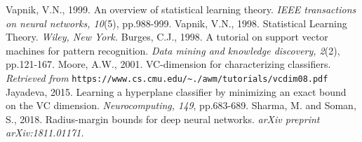 \documentclass[11pt]{article}
\begin{document}
\newpage
	
	\begin{thebibliography}{10}
        Vapnik, V.N., 1999. An overview of statistical learning theory. \emph{IEEE transactions on neural networks, 10}(5), pp.988-999.
        Vapnik, V.N., 1998. Statistical Learning Theory. \emph{Wiley, New York.}
        Burges, C.J., 1998. A tutorial on support vector machines for pattern recognition. \emph{Data mining and knowledge discovery, 2}(2), pp.121-167.
        Moore, A.W., 2001. VC-dimension for characterizing classifiers. \emph{Retrieved from} \texttt{https://www.cs.cmu.edu/\textasciitilde./awm/tutorials/vcdim08.pdf} %
        Jayadeva, 2015. Learning a hyperplane classifier by minimizing an exact bound on the VC dimension. \emph{Neurocomputing, 149}, pp.683-689.
        Sharma, M. and Soman, S., 2018. Radius-margin bounds for deep neural networks. \emph{arXiv preprint arXiv:1811.01171.}
	\end{thebibliography}
\end{document}
